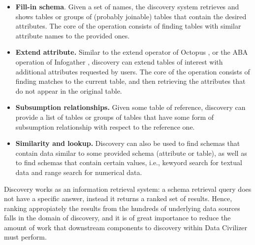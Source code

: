 \begin{itemize}
\item \textbf{Fill-in schema}. Given a set of names, the discovery system
retrieves and shows tables or groups of (probably joinable) tables that contain
the desired attributes. The core of the operation consists of finding tables
with similar attribute names to the provided ones.
\item \textbf{Extend attribute.} Similar to the extend operator of Octopus
\cite{octopus}, or the ABA operation of Infogather \cite{infogather}, discovery
can extend tables of interest with additional attributes requested by users. The
core of the operation consists of finding matches to the current table, and then
retrieving the attributes that do not appear in the original table.
\item \textbf{Subsumption relationships.} Given some table of reference,
discovery can provide a list of tables or groups of tables that have some form
of subsumption relationship with respect to the reference one. 
\item \textbf{Similarity and lookup.} Discovery can also be used to find schemas
that contain data similar to some provided schema (attribute or table), as well
as to find schemas that contain certain values, i.e., kewyord search for
textual data and range search for numerical data.
\end{itemize}

Discovery works as an information retrieval system: a schema retrieval query
does not have a specific answer, instead it returns a ranked set of results.
Hence, ranking appropiately the results from the hundreds of underlying data
sources falls in the domain of discovery, and it is of great importance to reduce
the amount of work that downstream components to discovery within Data Civilizer
must perform.

